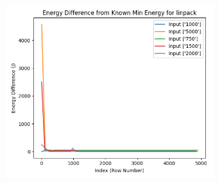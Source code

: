 \documentclass[times, 10pt,twocolumn]{article}
\begin{document}
\begin{figure}[ht]
\begin{subfigure}[b]{0.22\textwidth}
     \caption{}
     \label{fig:linpack_energy_diff}
   \end{subfigure}
   \hfill
   \begin{subfigure}[b]{0.22\textwidth}
      \includegraphics[width=\textwidth]{imgs/final_experiment_plots/model_analysis/measurement_data_analysis/linpack_compare_min.png}
     \caption{}
     \label{fig:linpack_compare_min}
   \end{subfigure}
   

\end{figure}
\end{document}
